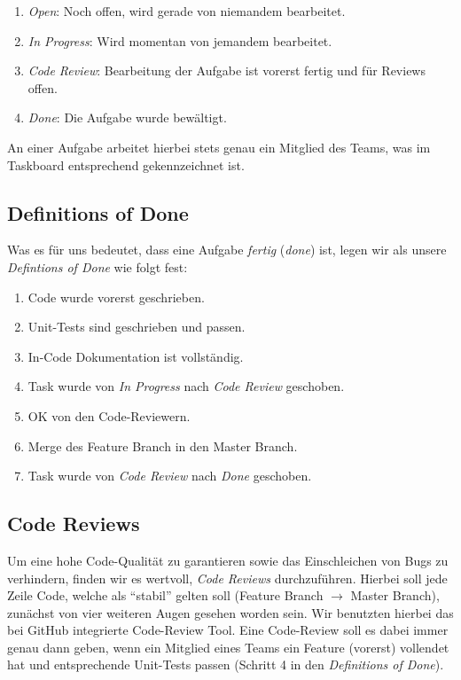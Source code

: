 \begin{enumerate}
  \item \emph{Open}: Noch offen, wird gerade von niemandem bearbeitet.
  \item \emph{In Progress}: Wird momentan von jemandem bearbeitet.
  \item \emph{Code Review}: Bearbeitung der Aufgabe ist vorerst fertig und für
    Reviews offen.
  \item \emph{Done}: Die Aufgabe wurde bewältigt.
\end{enumerate}

An einer Aufgabe arbeitet hierbei stets genau ein Mitglied des Teams, was im
Taskboard entsprechend gekennzeichnet ist.

\subsection{Definitions of Done}

Was es für uns bedeutet, dass eine Aufgabe \emph{fertig} (\emph{done}) ist,
legen wir als unsere \emph{Defintions of Done} wie folgt fest:

\begin{enumerate}
  \item Code wurde vorerst geschrieben.
  \item Unit-Tests sind geschrieben und passen.
  \item In-Code Dokumentation ist vollständig.
  \item Task wurde von \emph{In Progress} nach \emph{Code Review} geschoben.
  \item OK von den Code-Reviewern.
  \item Merge des Feature Branch in den Master Branch.
  \item Task wurde von \emph{Code Review} nach \emph{Done} geschoben.
\end{enumerate}

\subsection{Code Reviews}

Um eine hohe Code-Qualität zu garantieren sowie das Einschleichen von Bugs zu
verhindern, finden wir es wertvoll, \emph{Code Reviews} durchzuführen. Hierbei
soll jede Zeile Code, welche als ``stabil'' gelten soll (Feature Branch
$\rightarrow$ Master Branch), zunächst von vier weiteren Augen gesehen worden
sein. Wir benutzten hierbei das bei GitHub integrierte Code-Review Tool. Eine
Code-Review soll es dabei immer genau dann geben, wenn ein Mitglied eines Teams
ein Feature (vorerst) vollendet hat und entsprechende Unit-Tests passen (Schritt
4 in den \emph{Definitions of Done}).

